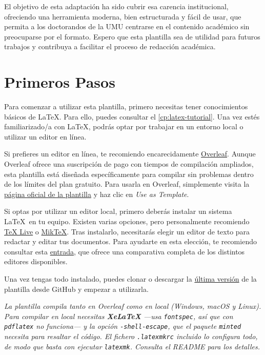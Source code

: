 {El objetivo de esta adaptación ha sido cubrir esa carencia institucional, ofreciendo una herramienta moderna, bien estructurada y fácil de usar, que permita a los doctorandos de la UMU centrarse en el contenido académico sin preocuparse por el formato. Espero que esta plantilla sea de utilidad para futuros trabajos y contribuya a facilitar el proceso de redacción académica.

\section{Primeros Pasos}

Para comenzar a utilizar esta plantilla, primero necesitas tener conocimientos básicos de \LaTeX. Para ello, puedes consultar el \autoref{cp:latex-tutorial}. Una vez estés familiarizado/a con \LaTeX, podrás optar por trabajar en un entorno local o utilizar un editor en línea.

Si prefieres un editor en línea, te recomiendo encarecidamente \href{https://www.overleaf.com/}{Overleaf}. Aunque Overleaf ofrece una suscripción de pago con tiempos de compilación ampliados, esta plantilla está diseñada específicamente para compilar sin problemas dentro de los límites del plan gratuito. Para usarla en Overleaf, simplemente visita la \href{https://www.overleaf.com/latex/templates/tesis-universidad-de-murcia/fdtnqcmbxndr}{página oficial de la plantilla} y haz clic en \textit{Use as Template}.

Si optas por utilizar un editor local, primero deberás instalar un sistema \LaTeX~en tu equipo. Existen varias opciones, pero personalmente recomiendo \href{https://www.tug.org/texlive/}{TeX Live} o \href{https://miktex.org/}{MikTeX}. Tras instalarlo, necesitarás elegir un editor de texto para redactar y editar tus documentos. Para ayudarte en esta elección, te recomiendo consultar esta \href{https://tex.stackexchange.com/questions/339/latex-editors-ides}{entrada}, que ofrece una comparativa completa de los distintos editores disponibles.

Una vez tengas todo instalado, puedes clonar o descargar la \href{https://github.com/enriiquee/umu-thesis}{última versión} de la plantilla desde GitHub y empezar a utilizarla.

\begin{block}[tip]
\textit{La plantilla compila tanto en Overleaf como en local (Windows, macOS y Linux). Para compilar en local necesitas \textbf{XeLaTeX} —usa \texttt{fontspec}, así que con \texttt{pdflatex} no funciona— y la opción \texttt{-shell-escape}, que el paquete \texttt{minted} necesita para resaltar el código. El fichero \texttt{.latexmkrc} incluido lo configura todo, de modo que basta con ejecutar \texttt{latexmk}. Consulta el README para los detalles.}
\end{block}

}
